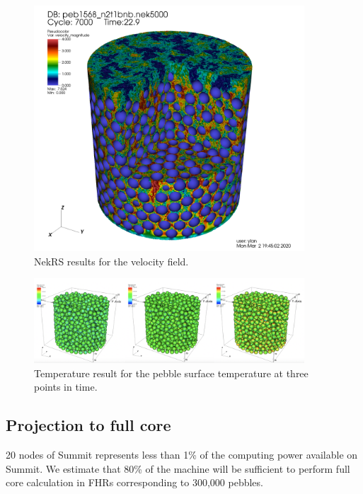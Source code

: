 \begin{figure}[!h]
\centering
\includegraphics[clip=true,width=0.9\textwidth]{Figures/ndemo_r3}
\caption{NekRS results for the velocity field.}
\label{f:ndemo3}
\end{figure}


\begin{figure}[!h]
\centering
\includegraphics[clip=true,width=0.9\textwidth]{Figures/ndemo_r4}
\caption{Temperature result for the pebble surface temperature at three points in time.}
\label{f:ndemo4}
\end{figure}

\subsection{Projection to full core}

20 nodes of Summit represents less than 1\% of the computing power available on Summit. We estimate that 80\% of the machine will be sufficient to perform full core calculation in FHRs corresponding to 300,000 pebbles.
